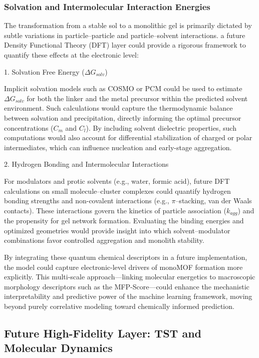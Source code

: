 \documentclass[12pt,a4paper]{article}
\begin{document}
\subsubsection{Solvation and Intermolecular Interaction Energies}

The transformation from a stable sol to a monolithic gel is primarily dictated by subtle variations in particle–particle and particle–solvent interactions. a future Density Functional Theory (DFT) layer could provide a rigorous framework to quantify these effects at the electronic level:

1. Solvation Free Energy ($\Delta G_{solv}$)  

   Implicit solvation models such as COSMO or PCM could be used to estimate $\Delta G_{solv}$ for both the linker and the metal precursor within the predicted solvent environment. Such calculations would capture the thermodynamic balance between solvation and precipitation, directly informing the optimal precursor concentrations ($C_m$ and $C_l$). By including solvent dielectric properties, such computations would also account for differential stabilization of charged or polar intermediates, which can influence nucleation and early-stage aggregation.

2. Hydrogen Bonding and Intermolecular Interactions  

   For modulators and protic solvents (e.g., water, formic acid), future DFT calculations on small molecule–cluster complexes could quantify hydrogen bonding strengths and non-covalent interactions (e.g., $\pi$–stacking, van der Waals contacts). These interactions govern the kinetics of particle association ($k_{agg}$) and the propensity for gel network formation. Evaluating the binding energies and optimized geometries would provide insight into which solvent–modulator combinations favor controlled aggregation and monolith stability.

By integrating these quantum chemical descriptors in a future implementation, the model could capture electronic-level drivers of monoMOF formation more explicitly. This multi-scale approach—linking molecular energetics to macroscopic morphology descriptors such as the MFP-Score—could enhance the mechanistic interpretability and predictive power of the machine learning framework, moving beyond purely correlative modeling toward chemically informed prediction.


\subsection{Future High-Fidelity Layer: TST and Molecular Dynamics}
\end{document}
